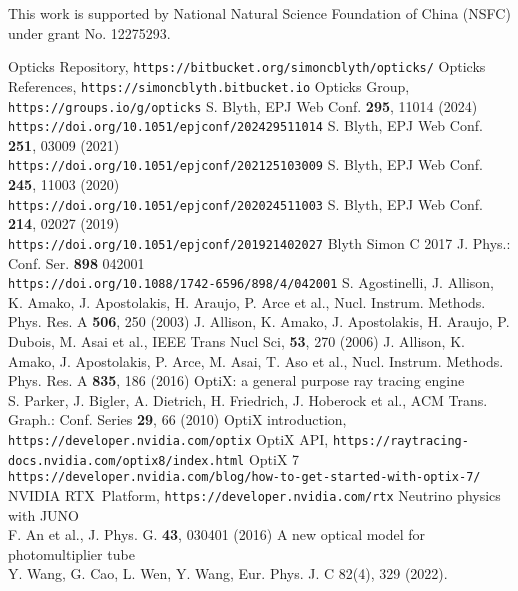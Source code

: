 \documentclass{webofc}
\begin{document}
This work is supported by National Natural Science Foundation of China (NSFC)
under grant No. 12275293.
%
\begin{thebibliography}{}
%
Opticks Repository, {\tt https://bitbucket.org/simoncblyth/opticks/}
Opticks References, {\tt https://simoncblyth.bitbucket.io}
Opticks Group, {\tt https://groups.io/g/opticks}
S. Blyth, EPJ Web Conf. {\bf 295}, 11014 (2024) \\
{\tt https://doi.org/10.1051/epjconf/202429511014}
S. Blyth, EPJ Web Conf. {\bf 251}, 03009 (2021) \\
{\tt https://doi.org/10.1051/epjconf/202125103009}
S. Blyth, EPJ Web Conf. {\bf 245}, 11003 (2020) \\
{\tt https://doi.org/10.1051/epjconf/202024511003}
S. Blyth, EPJ Web Conf. {\bf 214}, 02027 (2019) \\
{\tt https://doi.org/10.1051/epjconf/201921402027}
Blyth Simon C 2017 J. Phys.: Conf. Ser. {\bf 898} 042001 \\
{\tt https://doi.org/10.1088/1742-6596/898/4/042001}
%
S. Agostinelli, J. Allison, K. Amako, J. Apostolakis, H. Araujo, P. Arce et al., Nucl. Instrum. Methods. Phys. Res. A {\bf 506}, 250 (2003)
J. Allison, K. Amako, J. Apostolakis, H. Araujo, P. Dubois, M. Asai et al., IEEE Trans Nucl Sci, {\bf 53}, 270 (2006)
J. Allison, K. Amako, J. Apostolakis, P. Arce, M. Asai, T. Aso et al., Nucl. Instrum. Methods. Phys. Res. A {\bf 835}, 186 (2016)
%
%
OptiX: a general purpose ray tracing engine \\
S. Parker, J. Bigler, A. Dietrich, H. Friedrich, J. Hoberock et al., ACM Trans. Graph.: Conf. Series {\bf 29}, 66 (2010)
OptiX introduction, {\tt https://developer.nvidia.com/optix}
OptiX API, {\tt https://raytracing-docs.nvidia.com/optix8/index.html}
OptiX 7 {\tt https://developer.nvidia.com/blog/how-to-get-started-with-optix-7/}
NVIDIA RTX\texttrademark\, Platform, {\tt https://developer.nvidia.com/rtx}
Neutrino physics with JUNO \\
F. An et al., J. Phys. G. {\bf 43}, 030401 (2016) 
%
A new optical model for photomultiplier tube\\
Y. Wang, G. Cao, L. Wen, Y. Wang, Eur. Phys. J. C 82(4), 329 (2022).\\

\end{thebibliography}
\end{document}
